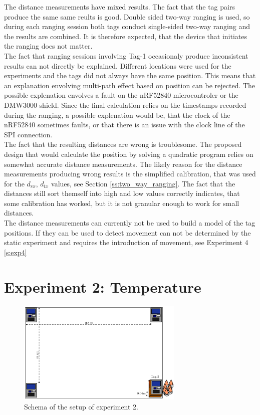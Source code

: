 The distance measurements have mixed results.
The fact that the tag pairs produce the same same reults is good.
Double sided two-way ranging is used, so during each ranging session both tags conduct single-sided two-way ranging and the results are combined.
It is therefore expected, that the device that initiates the ranging does not matter.\\
The fact that ranging sessions involving Tag-1 occasionaly produce inconsistent results can not directly be explained.
Different locations were used for the experiments and the tags did not always have the same position.
This means that an explanation envolving multi-path effect based on position can be rejected.
The possible explenation envolves a fault on the nRF52840 microcontroler or the DMW3000 shield. 
Since the final calculation relies on the timestamps recorded during the ranging, a possible explenation would be, that the clock of the nRF52840 sometimes faults, or that there is an issue with the clock line of the SPI connection.\\
The fact that the resulting distances are wrong is troublesome.
The proposed design that would calculate the position by solving a quadratic program relies on somewhat accurate distance measurements.
The likely reason for the distance measurements producing wrong results is the simplified calibration, that was used for the $d_{rx}$, $d_{tx}$ values, see Section \ref{ss:two_way_ranging}.
The fact that the distances still sort themself into high and low values correctly indicates, that some calibration has worked, but it is not granular enough to work for small distances.\\
The distance measurements can currently not be used to build a model of the tag positions.
If they can be used to detect movement can not be determined by the static experiment and requires the introduction of movement, see Experiment 4 \ref{s:exp4}


\section{Experiment 2: Temperature}
\label{ss:exp_2}

\begin{figure}[ht!]
	\centering
	\includegraphics[width=300px]{graphics/schematics/experiment_2.pdf}
	\caption{Schema of the setup of experiment 2.}
	\label{f:exp2_schematic}
\end{figure}


